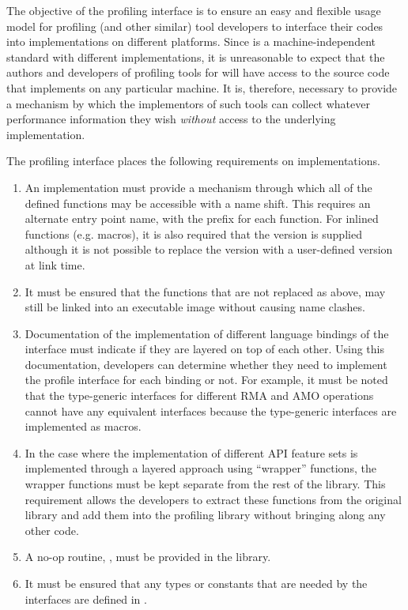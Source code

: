 The objective of the \openshmem profiling interface is to ensure an 
easy and flexible usage model for profiling (and other similar) 
tool developers to interface their codes into \openshmem 
implementations on different platforms. Since \openshmem is a 
machine-independent standard with different implementations, it is 
unreasonable to expect that the authors and developers of profiling 
tools for \openshmem will have access to the source code that 
implements \openshmem on any particular machine. It is, therefore,  
necessary to provide a mechanism by which the implementors of such 
tools can collect whatever performance information they wish 
\emph{without} access to the underlying implementation.

The \openshmem profiling interface places the following requirements 
on implementations. 

\begin{enumerate}
\item An \openshmem implementation must provide a mechanism through 
which all of the \openshmem defined functions may be accessible 
with a name shift. This requires an alternate 
entry point name, with the prefix  for each 
\openshmem function. For \openshmem inlined functions (e.g. macros), 
it is also required that the  version is supplied 
although it is not possible to replace the  version 
with a user-defined version at link time.
\item It must be ensured that the \openshmem functions that are not 
replaced as above, may still be linked into an executable image 
without causing name clashes. 
\item Documentation of the implementation of different language 
bindings of the \openshmem interface must indicate if they 
are layered on top of each other. Using this documentation,   
developers can determine whether they need to implement the 
profile interface for each binding or not. For example, it must 
be noted that the \openshmem \Cstd[11] type-generic interfaces for 
different \ac{RMA} and \ac{AMO} operations cannot have any equivalent
 interfaces because the \Cstd[11] type-generic 
interfaces are implemented as macros.
\item In the case where the implementation of different \ac{API}  
feature sets is implemented through a layered approach using 
``wrapper'' functions, the wrapper functions must be kept separate 
from the rest of the library. This requirement allows the developers 
to extract these functions from the original \openshmem library 
and add them into the profiling library without bringing along any 
other code.
\item A no-op routine, , must be provided 
in the \openshmem library.
\item It must be ensured that any \openshmem types or constants that are 
needed by the  interfaces are defined in .
\end{enumerate}

